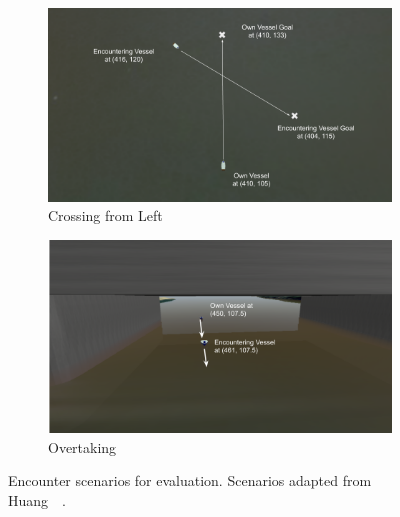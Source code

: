 \begin{figure}[H]
        \begin{subfigure}[b]{0.495\textwidth}
            \centering
            \includegraphics[width=\textwidth]{figs/Chap5/simulation_uwsim_crossingleft_starting_pos.png}
            \caption{Crossing from Left}
            \label{fig:simulation_uwsim_crossingleft_starting_pos}
        \end{subfigure}
        \begin{subfigure}[b]{0.495\textwidth}
            \centering
            \includegraphics[width=\textwidth]{figs/Chap5/simulation_uwsim_overtake_starting_pos.png}
            \caption{Overtaking}
            \label{fig:simulation_uwsim_overtake_starting_pos}
        \end{subfigure}
    
    \caption{Encounter scenarios for evaluation. Scenarios adapted from Huang~\etal{}~\cite{Huang2019Generalized}.}
    \label{fig:simulation_uwsim_encounters}
    \end{figure}



    
